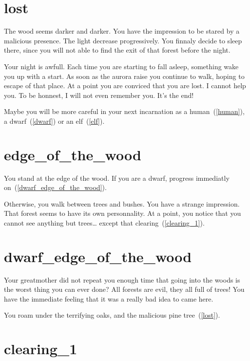\section{lost}

The wood seems darker and darker. You have the impression to be stared by a
malicious presence. The light decrease progressively. You finnaly decide to
sleep there, since you will not able to find the exit of that forest before the
night.

Your night is awfull. Each time you are starting to fall asleep, something wake
you up with a start. As soon as the aurora raise you continue to walk, hoping to
escape of that place. At a point you are conviced that you are lost. I cannot
help you. To be honnest, I will not even remember you. It's the end!

\medbreak

Maybe you will be more careful in your next incarnation as a
human~(\ref{human}), a dwarf~(\ref{dwarf}) or an elf~(\ref{elf}).

\section{edge_of_the_wood}

You stand at the edge of the wood. If you are a dwarf, progress immediatly
on~(\ref{dwarf_edge_of_the_wood}).

\medbreak

Otherwise, you walk between trees and bushes. You have a strange impression.
That forest seems to have its own personnality. At a point, you notice that you
cannot see anything but trees… except that clearing~(\ref{clearing_1}).

\section{dwarf_edge_of_the_wood}

Your greatmother did not repeat you enough time that going into the woods is
the worst thing you can ever done? All forests are evil, they all full of trees!
You have the immediate feeling that it was a really bad idea to came here.

You roam under the terrifying oaks, and the malicious pine tree~(\ref{lost}).

\section{clearing_1}

